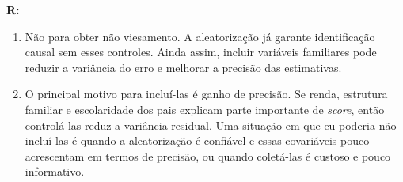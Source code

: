 \documentclass[12pt,letterpaper, onecolumn]{exam}
\renewenvironment{solution}
{\par\noindent\textbf{R:}\enspace\color{blue}}
{\par\color{black}}
\begin{document}
\begin{questions}
\begin{solution}
\begin{enumerate}[label=(\roman*)]
    \item Não para obter não viesamento. A aleatorização já garante identificação causal sem esses controles. Ainda assim, incluir variáveis familiares pode reduzir a variância do erro e melhorar a precisão das estimativas.

    \item O principal motivo para incluí-las é ganho de precisão. Se renda, estrutura familiar e escolaridade dos pais explicam parte importante de \textit{score}, então controlá-las reduz a variância residual. Uma situação em que eu poderia não incluí-las é quando a aleatorização é confiável e essas covariáveis pouco acrescentam em termos de precisão, ou quando coletá-las é custoso e pouco informativo.
\end{enumerate}
\end{solution}

\vspace{0.7cm}


\end{questions}
\end{document}
